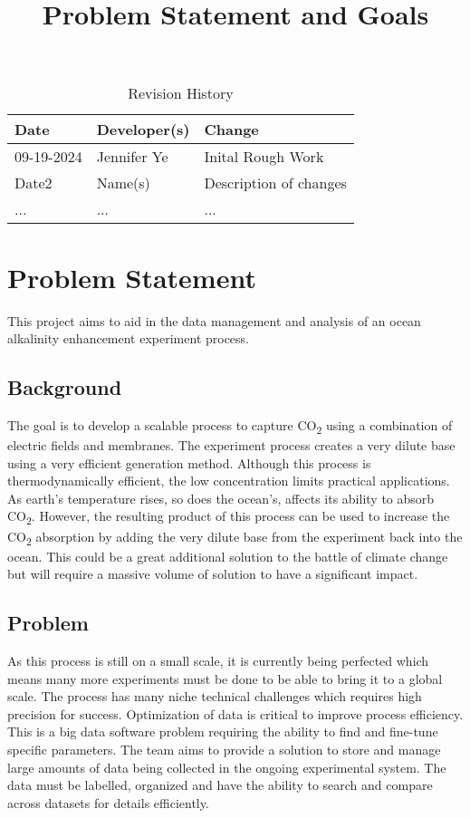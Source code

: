 \documentclass{article}
\title{Problem Statement and Goals\\\progname}
\author{\authname}
\date{}
\begin{document}
\maketitle

\begin{table}[hp]
\caption{Revision History} \label{TblRevisionHistory}
\begin{tabularx}{\textwidth}{llX}
\toprule
\textbf{Date} & \textbf{Developer(s)} & \textbf{Change}\\
\midrule
09-19-2024 & Jennifer Ye & Inital Rough Work \\
Date2 & Name(s) & Description of changes\\
... & ... & ...\\
\bottomrule
\end{tabularx}
\end{table}


\section{Problem Statement}
This project aims to aid in the data management and analysis of an ocean
alkalinity enhancement experiment process.

\subsection{Background}
The goal is to develop a scalable process to capture CO\textsubscript{2} using a
combination of electric fields and membranes. The experiment process creates a
very dilute base using a very efficient generation method. Although this process
is thermodynamically efficient, the low concentration limits practical
applications. As earth's temperature rises, so does the ocean's, affects its
ability to absorb CO\textsubscript{2}. However, the resulting product of this
process can be used to increase the CO\textsubscript{2} absorption by adding the
very dilute base from the experiment back into the ocean. This could be a great
additional solution to the battle of climate change but will require a massive
volume of solution to have a significant impact.

\subsection{Problem}
As this process is still on a small scale, it is currently being perfected which
means many more experiments must be done to be able to bring it to a global
scale. The process has many niche technical challenges which requires high
precision for success. Optimization of data is critical to improve process
efficiency. This is a big data software problem requiring the ability to find
and fine-tune specific parameters. \newline \newline
The team aims to provide a solution to store and manage large amounts of data
being collected in the ongoing experimental system. The data must be labelled,
organized and have the ability to search and compare across datasets for details
efficiently.
\end{document}
